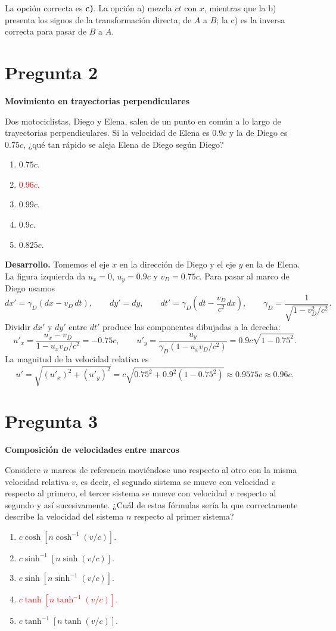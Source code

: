 \documentclass[a4paper,11pt]{article}
\newcommand{\pregunta}[2]{\section*{Pregunta #1}\textbf{#2}\par}
\begin{document}
La opción correcta es \textbf{c)}. La opción a) mezcla $ct$ con $x$, mientras que la b) presenta los signos de la transformación directa, de $A$ a $B$; la c) es la inversa correcta para pasar de $B$ a $A$.
\parencite[Sec. 2.4, pp. 53--61]{chaparro2026}

\pregunta{2}{Movimiento en trayectorias perpendiculares}

Dos motociclistas, Diego y Elena, salen de un punto en común a lo largo de trayectorias perpendiculares. Si la velocidad de Elena es $0.9c$ y la de Diego es $0.75c$, ¿qué tan rápido se aleja Elena de Diego según Diego?

\begin{enumerate}
    \item $0.75c$.
    \item \textcolor{red}{$0.96c$.}
    \item $0.99c$.
    \item $0.9c$.
    \item $0.825c$.
\end{enumerate}

\begin{figure}[H]
\centering

\end{figure}

\textbf{Desarrollo.} Tomemos el eje $x$ en la dirección de Diego y el eje $y$ en la de Elena. La figura izquierda da $u_x=0$, $u_y=0.9c$ y $v_D=0.75c$. Para pasar al marco de Diego usamos
\[
dx'=\gamma_D(dx-v_D\,dt),\qquad dy'=dy,\qquad
dt'=\gamma_D\left(dt-\frac{v_D}{c^2}dx\right),
\qquad \gamma_D=\frac{1}{\sqrt{1-v_D^2/c^2}}.
\]
Dividir $dx'$ y $dy'$ entre $dt'$ produce las componentes dibujadas a la derecha:
\[
u'_x=\frac{u_x-v_D}{1-u_xv_D/c^2}=-0.75c,
\qquad
u'_y=\frac{u_y}{\gamma_D(1-u_xv_D/c^2)}
=0.9c\sqrt{1-0.75^2}.
\]
La magnitud de la velocidad relativa es
\[
u'=\sqrt{(u'_x)^2+(u'_y)^2}
=c\sqrt{0.75^2+0.9^2(1-0.75^2)}
\approx0.9575c\approx0.96c.
\]
\parencite[Sec. 2.4.4, pp. 61--63]{chaparro2026}

\pregunta{3}{Composición de velocidades entre marcos}

Considere $n$ marcos de referencia moviéndose uno respecto al otro con la misma velocidad relativa $v$, es decir, el segundo sistema se mueve con velocidad $v$ respecto al primero, el tercer sistema se mueve con velocidad $v$ respecto al segundo y así sucesivamente. ¿Cuál de estas fórmulas sería la que correctamente describe la velocidad del sistema $n$ respecto al primer sistema?

\begin{enumerate}[itemsep=0.6em]
    \item $c\cosh\!\left[n\cosh^{-1}(v/c)\right]$.
    \item $c\sinh^{-1}\!\left[n\sinh(v/c)\right]$.
    \item $c\sinh\!\left[n\sinh^{-1}(v/c)\right]$.
    \item \textcolor{red}{$c\tanh\!\left[n\tanh^{-1}(v/c)\right]$.}
    \item $c\tanh^{-1}\!\left[n\tanh(v/c)\right]$.
\end{enumerate}
\end{document}
